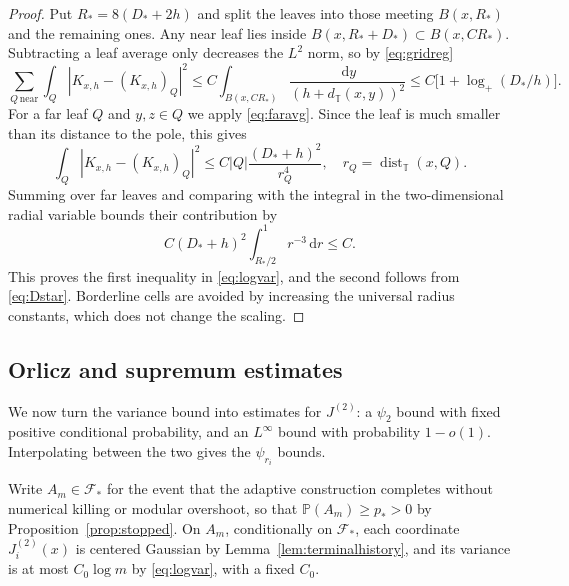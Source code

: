 \documentclass[11pt]{article}
\theoremstyle{definition}
\theoremstyle{remark}
\numberwithin{equation}{section}
\newcommand{\T}{\mathbb T}
\newcommand{\F}{\mathcal F}
\newcommand{\dist}{\operatorname{dist}}
\newcommand{\dd}{\,\mathrm d}
\begin{document}
\begin{proof}
Put $R_*=8(D_*+2h)$ and split the leaves into those meeting
$B(x,R_*)$ and the remaining ones. Any near leaf lies inside
$B(x,R_*+D_*)\subset B(x,CR_*)$. Subtracting a leaf average
only decreases the $L^2$ norm, so by \eqref{eq:gridreg}
\[
 \sum_{Q\,\mathrm{near}}\int_Q|K_{x,h}-(K_{x,h})_Q|^2
 \le C\int_{B(x,CR_*)}\frac{\dd y}{(h+d_{\T}(x,y))^2}
 \le C\bigl[1+\log_+(D_*/h)\bigr].
\]
For a far leaf $Q$ and $y,z\in Q$ we apply \eqref{eq:faravg}. Since
the leaf is much smaller than its distance to the pole, this gives
\[
 \int_Q|K_{x,h}-(K_{x,h})_Q|^2
 \le C|Q|\frac{(D_*+h)^2}{r_Q^4},
 \quad r_Q=\dist_{\T}(x,Q).
\]
Summing over far leaves and comparing with the integral in
the two-dimensional radial variable bounds their contribution by
\[
 C(D_*+h)^2\int_{R_*/2}^{1}r^{-3}\dd r\le C.
\]
This proves the first inequality in \eqref{eq:logvar}, and the second
follows from \eqref{eq:Dstar}. Borderline cells are avoided by
increasing the universal radius constants, which does not change the
scaling.
\end{proof}

\subsection{Orlicz and supremum estimates}
We now turn the variance bound into estimates for $J^{(2)}$: a
$\psi_2$ bound with fixed positive conditional probability, and an
$L^\infty$ bound with probability $1-o(1)$. Interpolating between the
two gives the $\psi_{r_i}$ bounds.

Write $A_m\in\mathcal F_*$ for the event that the adaptive construction
completes without numerical killing or modular overshoot, so that
$\mathbb P(A_m)\ge p_*>0$ by Proposition~\ref{prop:stopped}. On $A_m$,
conditionally on $\F_*$, each coordinate $J^{(2)}_i(x)$ is centered
Gaussian by Lemma~\ref{lem:terminalhistory}, and its variance is at most
$C_0\log m$ by \eqref{eq:logvar}, with a fixed $C_0$.
\end{document}
